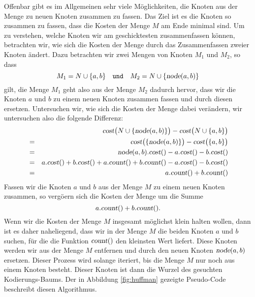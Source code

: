 Offenbar gibt es im Allgemeinen sehr viele M\"oglichkeiten, die Knoten aus der Menge zu
neuen Knoten zusammen zu fassen.  Das Ziel ist es die Knoten so zusammen zu fassen, dass
die Kosten der Menge $M$ am Ende  minimal sind.
Um zu verstehen, welche Knoten wir am geschicktesten zusammenfassen k\"onnen, betrachten wir, wie
sich die Kosten der Menge durch das Zusammenfassen zweier Knoten \"andert.
Dazu betrachten wir zwei Mengen von Knoten $M_1$ und $M_2$, so dass 
\[ M_1 = N \cup \{ a, b\} \quad \mathtt{und} \quad M_2 = N \cup \{ \textsl{node}(a,b) \} \]
gilt, die Menge $M_1$ geht also aus der Menge $M_2$ dadurch hervor, dass wir
die Knoten $a$ und $b$ zu einem neuen Knoten zusammen fassen und durch diesen ersetzen.
Untersuchen wir, wie
sich die Kosten der Menge dabei ver\"andern, wir untersuchen also die folgende Differenz:
\begin{eqnarray*}
& & \textsl{cost}\bigl(N \cup \{ \textsl{node}(a,b) \}\bigr) - \textsl{cost}\bigl(N \cup \{ a,b \}\bigr) \\
&=& \textsl{cost}\bigl( \{ \textsl{node}(a,b) \}\bigr) - \textsl{cost}\bigl(\{ a,b \}\bigr)              \\
&=& \textsl{node}(a,b).\textsl{cost}() - a.\textsl{cost}() - b.\textsl{cost}()                           \\
&=&   a.\textsl{cost}() + b.\textsl{cost}() + a.\textsl{count}() + b.\textsl{count}() 
    - a.\textsl{cost}() - b.\textsl{cost}()                                                              \\
&=& a.\textsl{count}() + b.\textsl{count}() 
\end{eqnarray*}
Fassen wir die Knoten $a$ und $b$ aus der Menge $M$ zu einem neuen Knoten zusammen, so verg\"o\3ern sich
die Kosten der Menge um die Summe
\[ a.\textsl{count}() + b.\textsl{count}(). \]
Wenn wir die Kosten der Menge $M$ insgesamt m\"oglichst klein halten wollen, dann ist es daher naheliegend,
dass wir in der Menge $M$ die beiden Knoten $a$ und $b$ suchen, f\"ur die die Funktion
$\textsl{count}()$ den kleinsten Wert liefert.  Diese Knoten werden wir aus der Menge $M$
entfernen und durch den neuen Knoten $\textsl{node}(a,b)$ ersetzen.
Dieser Prozess wird solange iteriert, bis die Menge $M$ nur noch aus einem Knoten besteht.  Dieser
Knoten ist dann die Wurzel des gesuchten Kodierungs-Baums. 
Der in Abbildung \ref{fig:huffman} gezeigte Pseudo-Code beschreibt diesen Algorithmus.

